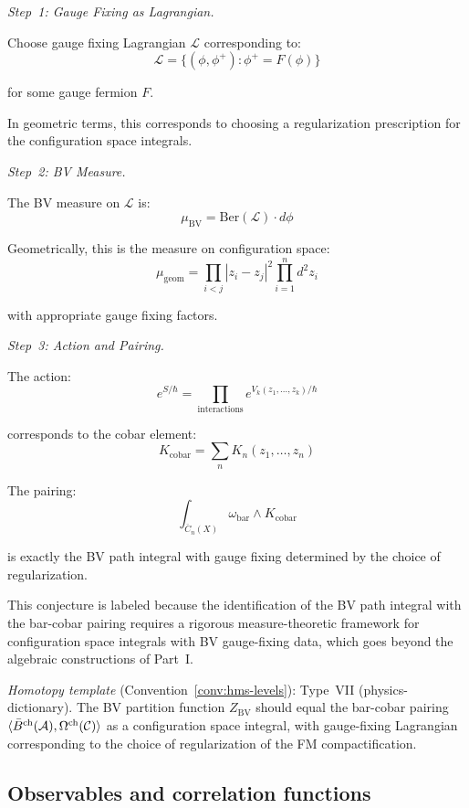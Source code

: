 \begin{evidence}
\emph{Step~1: Gauge Fixing as Lagrangian.}

Choose gauge fixing Lagrangian $\mathcal{L}$ corresponding to:
\[\mathcal{L} = \{(\phi, \phi^+) : \phi^+ = F(\phi)\}\]

for some gauge fermion $F$.

In geometric terms, this corresponds to choosing a regularization prescription 
for the configuration space integrals.

\emph{Step~2: BV Measure.}

The BV measure on $\mathcal{L}$ is:
\[\mu_{\text{BV}} = \text{Ber}(\mathcal{L}) \cdot d\phi\]

Geometrically, this is the measure on configuration space:
\[\mu_{\text{geom}} = \prod_{i<j} |z_i - z_j|^2 \prod_{i=1}^n d^2z_i\]

with appropriate gauge fixing factors.

\emph{Step~3: Action and Pairing.}

The action:
\[e^{S/\hbar} = \prod_{\text{interactions}} e^{V_k(z_1, \ldots, z_k)/\hbar}\]

corresponds to the cobar element:
\[K_{\text{cobar}} = \sum_n K_n(z_1, \ldots, z_n)\]

The pairing:
\[\int_{\overline{C}_n(X)} \omega_{\text{bar}} \wedge K_{\text{cobar}}\]

is exactly the BV path integral with gauge fixing determined by the choice of
regularization.
\end{evidence}

\begin{remark}[Scope]
This conjecture is labeled \ClaimStatusHeuristic{} because the identification of the
BV path integral with the bar-cobar pairing requires a rigorous measure-theoretic
framework for configuration space integrals with BV gauge-fixing data, which goes
beyond the algebraic constructions of Part~I.

\emph{Homotopy template} (Convention~\ref{conv:hms-levels}): Type~VII (physics-dictionary).
The BV partition function $Z_{\mathrm{BV}}$ should equal the bar-cobar pairing $\langle \bar{B}^{\mathrm{ch}}(\mathcal{A}), \Omega^{\mathrm{ch}}(\mathcal{C}) \rangle$ as a configuration space integral, with gauge-fixing Lagrangian corresponding to the choice of regularization of the FM compactification.
\end{remark}

\subsection{Observables and correlation functions}

